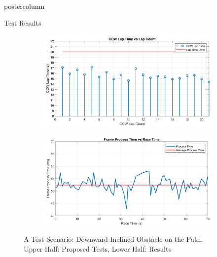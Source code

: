 \documentclass{beamer}
\begin{document}
\begin{frame}
\begin{columns}
\begin{column}{.5\textwidth}
\begin{beamercolorbox}[center]{postercolumn}
\begin{minipage}{.98\textwidth}
{\begin{myblock}{Test Results}
			\begin{figure}[H]
				\setlength{\unitlength}{\textwidth} 
				\centering
				\begin{subfigure}{.45\textwidth}
					\centering
					\includegraphics[width=\textwidth]{img/ccwLapTime_crop}
				\end{subfigure}%
				\begin{subfigure}{.45\textwidth}
					\centering
				\includegraphics[width=\textwidth]{img/ProcessTime_crop}
				\end{subfigure}
				\caption{\label{fig:dataP_down} A Test Scenario: Downward Inclined Obstacle on the Path. \\ Upper Half: Proposed Tests, Lower Half: Results}
			\end{figure}
			

\end{myblock}}
\end{minipage}
\end{beamercolorbox}
\end{column}
\end{columns}
\end{frame}
\end{document}
